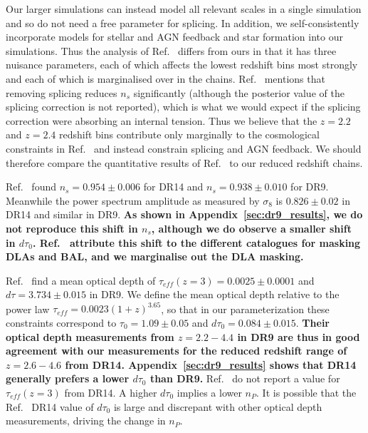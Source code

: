 Our larger simulations can instead model all relevant scales in a single simulation and so do not need a free parameter for splicing.
In addition, we self-consistently incorporate models for stellar and AGN feedback and star formation into our simulations.
Thus the analysis of Ref.~\cite{2020JCAP...04..038P} differs from ours in that it has three nuisance parameters, each of which affects the lowest redshift bins most strongly and each of which is marginalised over in the chains.
Ref.~\cite{2015JCAP...02..045P} mentions that removing splicing reduces $n_s$ significantly (although the posterior value of the splicing correction is not reported), which is what we would expect if the splicing correction were absorbing an internal tension. 
Thus we believe that the $z=2.2$ and $z=2.4$ redshift bins contribute only marginally to the cosmological constraints in Ref.~\cite{2020JCAP...04..038P} and instead constrain splicing and AGN feedback. 
We should therefore compare the quantitative results of Ref.~\cite{2020JCAP...04..038P} to our reduced redshift chains. 

Ref.~\cite{2020JCAP...04..038P} found $n_s = 0.954 \pm 0.006$ for DR14 and $n_s = 0.938 \pm 0.010$ for DR9.
Meanwhile the power spectrum amplitude as measured by $\sigma_8$ is $0.826 \pm 0.02$ in DR14 and similar in DR9.
\textbf{As shown in Appendix~\ref{sec:dr9_results}, we do not reproduce this shift in $n_s$, although we do observe a smaller shift in $d\tau_0$. Ref.~\cite{2020JCAP...04..038P} attribute this shift to the different catalogues for masking DLAs and BAL, and we marginalise out the DLA masking.}

Ref.~\cite{2015JCAP...11..011P} find a mean optical depth of $\tau_{eff} (z=3) = 0.0025 \pm 0.0001$ and $d\tau = 3.734 \pm 0.015$ in DR9.
We define the mean optical depth relative to the power law $\tau_{eff} = 0.0023 (1+z)^{3.65}$, so that in our parameterization these constraints correspond to $\tau_0 = 1.09 \pm 0.05$ and $d\tau_0 = 0.084\pm 0.015$.
\textbf{Their optical depth measurements from $z=2.2 - 4.4$ in DR9 are thus in good agreement with our measurements for the reduced redshift range of $z=2.6 - 4.6$ from DR14. Appendix~\ref{sec:dr9_results} shows that DR14 generally prefers a lower $d\tau_0$ than DR9.}
Ref.~\cite{2020JCAP...04..038P} do not report a value for $\tau_{eff}(z=3)$ from DR14. A higher $d\tau_0$ implies a lower $n_P$. It is possible that the Ref.~\cite{2020JCAP...04..038P} DR14 value of $d\tau_0$ is large and discrepant with other optical depth measurements, driving the change in $n_P$.

